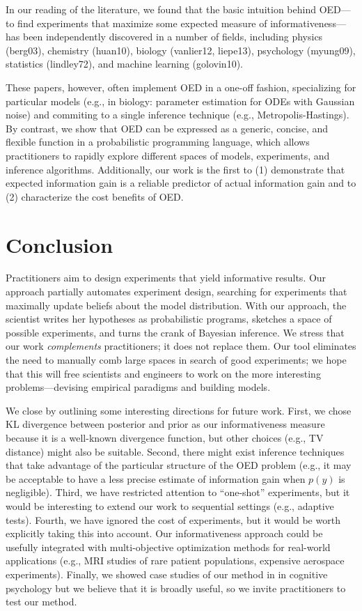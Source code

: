 \documentclass{article}
\begin{document}
In our reading of the literature, we found that the basic intuition behind OED---to find experiments that maximize some expected measure of informativeness---has been independently discovered in a number of fields, including physics (berg03), chemistry (huan10), biology (vanlier12, liepe13), psychology (myung09), statistics (lindley72), and machine learning (golovin10).

These papers, however, often implement OED in a one-off fashion, specializing for  particular models (e.g., in biology: parameter estimation for ODEs with Gaussian noise) and commiting to a single inference technique (e.g., Metropolis-Hastings).
By contrast, we show that OED can be expressed as a generic, concise, and flexible function in a probabilistic programming language, which allows practitioners to rapidly explore different spaces of models, experiments, and inference algorithms.
Additionally, our work is the first to (1) demonstrate that expected information gain is a reliable predictor of actual information gain and to (2) characterize the cost benefits of OED.

\section{Conclusion}

Practitioners aim to design experiments that yield informative results.
Our approach partially automates experiment design, searching for experiments that maximally update beliefs about the model distribution.
With our approach, the scientist writes her hypotheses as probabilistic programs, sketches a space of possible experiments, and turns the crank of Bayesian inference.
We stress that our work \emph{complements} practitioners; it does not replace them.
Our tool eliminates the need to manually comb large spaces in search of good experiments; we hope that this will free scientists and engineers to work on the more interesting problems---devising empirical paradigms and building models.

We close by outlining some interesting directions for future work.
First, we chose KL divergence between posterior and prior as our informativeness measure because it is a well-known divergence function, but other choices (e.g., TV distance) might also be suitable.
Second, there might exist inference techniques that take advantage of the particular structure of the OED problem (e.g., it may be acceptable to have a less precise estimate of information gain when $p(y)$ is negligible).
Third, we have restricted attention to ``one-shot'' experiments, but it would be interesting to extend our work to sequential settings (e.g., adaptive tests).
Fourth, we have ignored the cost of experiments, but it would be worth explicitly taking this into account.
Our informativeness approach could be usefully integrated with multi-objective optimization methods for real-world applications (e.g., MRI studies of rare patient populations, expensive aerospace experiments).
Finally, we showed case studies of our method in in cognitive psychology but we believe that it is broadly useful, so we invite practitioners to test our method.



\end{document}
